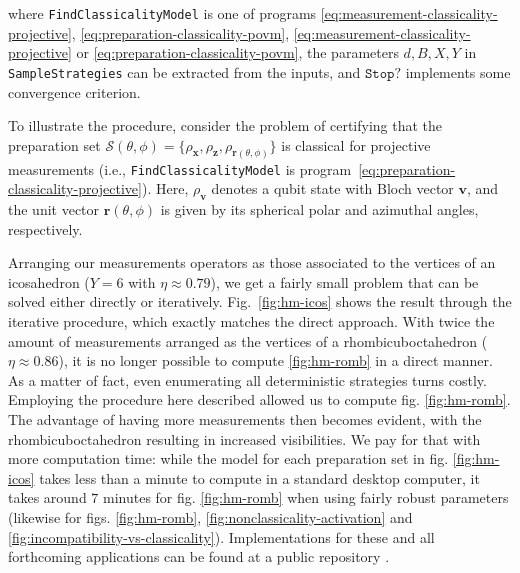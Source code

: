 	where \texttt{FindClassicalityModel} is one of programs \eqref{eq:measurement-classicality-projective}, \eqref{eq:preparation-classicality-povm}, \eqref{eq:measurement-classicality-projective} or \eqref{eq:preparation-classicality-povm}, the parameters $d, B, X, Y$ in \texttt{SampleStrategies} can be extracted from the inputs, and $\texttt{Stop?}$ implements some convergence criterion.

	To illustrate the procedure, consider the problem of certifying that the preparation set $\mathcal{S}(\theta, \phi) = \{ \rho_{\mathbf{x}}, \rho_{\mathbf{z}}, \rho_{\mathbf{r}(\theta, \phi)} \}$ is classical for projective measurements (i.e., \texttt{FindClassicalityModel} is program~\eqref{eq:preparation-classicality-projective}). Here, $\rho_{\mathbf{v}}$ denotes a qubit state with Bloch vector $\mathbf{v}$, and the unit vector $\mathbf{r}(\theta, \phi)$ is given by its spherical polar and azimuthal angles, respectively.

	Arranging our measurements operators as those associated to the vertices of an icosahedron ($Y = 6$ with $\eta \approx 0.79$), we get a fairly small problem that can be solved either directly or iteratively. Fig.~\ref{fig:hm-icos} shows the result through the iterative procedure, which exactly matches the direct approach. With twice the amount of measurements arranged as the vertices of a rhombicuboctahedron ($\eta \approx 0.86$), it is no longer possible to compute \ref{fig:hm-romb} in a direct manner. As a matter of fact, even enumerating all deterministic strategies turns costly. Employing the procedure here described allowed us to compute fig. \ref{fig:hm-romb}. The advantage of having more measurements then becomes evident, with the rhombicuboctahedron resulting in increased visibilities. We pay for that with more computation time: while the model for each preparation set in fig. \ref{fig:hm-icos} takes less than a minute to compute in a standard desktop computer, it takes around $7$ minutes for fig. \ref{fig:hm-romb} when using fairly robust parameters (likewise for figs. \ref{fig:hm-romb}, \ref{fig:nonclassicality-activation} and \ref{fig:incompatibility-vs-classicality}). Implementations for these and all forthcoming applications can be found at a public repository \cite{classicality_repository}.


